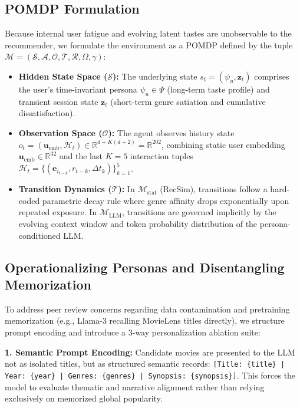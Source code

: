 \documentclass{article}
\begin{document}
\subsection{POMDP Formulation}
Because internal user fatigue and evolving latent tastes are unobservable to the recommender, we formulate the environment as a POMDP defined by the tuple $\mathcal{M} = (\mathcal{S}, \mathcal{A}, \mathcal{O}, \mathcal{T}, \mathcal{R}, \Omega, \gamma)$:
\begin{itemize}
    \item \textbf{Hidden State Space ($\mathcal{S}$):} The underlying state $s_t = (\psi_u, \bm{z}_t)$ comprises the user's time-invariant persona $\psi_u \in \Psi$ (long-term taste profile) and transient session state $\bm{z}_t$ (short-term genre satiation and cumulative dissatisfaction).
    \item \textbf{Observation Space ($\mathcal{O}$):} The agent observes history state $o_t = (\bm{u}_{\text{emb}}, \mathcal{H}_t) \in \mathbb{R}^{d + K(d+2)} = \mathbb{R}^{202}$, combining static user embedding $\bm{u}_{\text{emb}} \in \mathbb{R}^{32}$ and the last $K=5$ interaction tuples $\mathcal{H}_t = \{(\bm{e}_{i_{t-k}}, r_{t-k}, \Delta t_k)\}_{k=1}^5$.
    \item \textbf{Transition Dynamics ($\mathcal{T}$):} In $\mathcal{M}_{\text{stat}}$ (RecSim), transitions follow a hard-coded parametric decay rule where genre affinity drops exponentially upon repeated exposure. In $\mathcal{M}_{\text{LLM}}$, transitions are governed implicitly by the evolving context window and token probability distribution of the persona-conditioned LLM.
\end{itemize}

\subsection{Operationalizing Personas and Disentangling Memorization}
To address peer review concerns regarding data contamination and pretraining memorization (e.g., Llama-3 recalling MovieLens titles directly), we structure prompt encoding and introduce a 3-way personalization ablation suite:

\textbf{1. Semantic Prompt Encoding:} Candidate movies are presented to the LLM not as isolated titles, but as structured semantic records: \texttt{[Title: \{title\} | Year: \{year\} | Genres: \{genres\} | Synopsis: \{synopsis\}]}. This forces the model to evaluate thematic and narrative alignment rather than relying exclusively on memorized global popularity.
\end{document}
